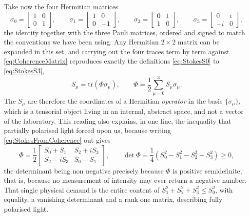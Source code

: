             Take now the four Hermitian matrices
            \begin{equation}\label{eq:PauliOptics}
                \sigma_0=\begin{bmatrix}1&0\\0&1\end{bmatrix}, \qquad \sigma_1=\begin{bmatrix}1&0\\0&-1\end{bmatrix}, \qquad \sigma_2=\begin{bmatrix}0&1\\1&0\end{bmatrix}, \qquad \sigma_3=\begin{bmatrix}0&i\\-i&0\end{bmatrix},
            \end{equation}
            the identity together with the three Pauli matrices, ordered and signed to match the conventions we have been using. Any Hermitian $2\times2$ matrix can be expanded in this set, and carrying out the four traces term by term against \ref{eq:CoherenceMatrix} reproduces exactly the definitions \ref{eq:StokesS0} to \ref{eq:StokesS3},
            \begin{equation}\label{eq:StokesFromCoherence}
                S_\mu = \text{tr}\left(\Phi\sigma_\mu\right), \qquad \Phi = \frac{1}{2}\sum_{\mu=0}^{3}S_\mu\sigma_\mu.
            \end{equation}
            The $S_\mu$ are therefore the coordinates of a Hermitian \textit{operator} in the basis $\{\sigma_\mu\}$, which is a tensorial object living in an internal, abstract space, and not a vector of the laboratory. This reading also explains, in one line, the inequality that partially polarised light forced upon us, because writing \ref{eq:StokesFromCoherence} out gives
            \begin{equation*}
                \Phi = \frac{1}{2}\begin{bmatrix} S_0+S_1 & S_2+iS_3 \\ S_2-iS_3 & S_0-S_1 \end{bmatrix}, \qquad \det \Phi = \frac{1}{4}\left(S_0^2-S_1^2-S_2^2-S_3^2\right)\geq0,
            \end{equation*}
            the determinant being non negative precisely because $\Phi$ is positive semidefinite, that is, because no measurement of intensity may ever return a negative number. That single physical demand is the entire content of $S_1^2+S_2^2+S_3^2\leq S_0^2$, with equality, a vanishing determinant and a rank one matrix, describing fully polarised light.

